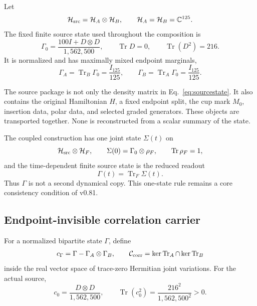\documentclass[12pt,a4paper,twoside]{article}
\begin{document}
Let
\begin{equation}
\mathcal H_{\rm src}=\mathcal H_A\otimes\mathcal H_B,
\qquad \mathcal H_A=\mathcal H_B=\mathbb C^{125}.
\label{eq:sourcehilbert}
\end{equation}
The fixed finite source state used throughout the composition is
\begin{equation}
\Gamma_0=\frac{100I+D\otimes D}{1{,}562{,}500},
\qquad \operatorname{Tr}D=0,
\qquad \operatorname{Tr}(D^2)=216.
\label{eq:sourcestate}
\end{equation}
It is normalized and has maximally mixed endpoint marginals,
\begin{equation}
\Gamma_A=\operatorname{Tr}_B\Gamma_0=\frac{I_{125}}{125},
\qquad
\Gamma_B=\operatorname{Tr}_A\Gamma_0=\frac{I_{125}}{125}.
\label{eq:marginals}
\end{equation}

The source package is not only the density matrix in Eq.~\eqref{eq:sourcestate}. It also contains the original Hamiltonian $H$, a fixed endpoint split, the cup mark $M_0$, insertion data, polar data, and selected graded generators. These objects are transported together. None is reconstructed from a scalar summary of the state.

The coupled construction has one joint state $\Sigma(t)$ on
\begin{equation}
\mathcal H_{\rm src}\otimes\mathcal H_F,
\qquad \Sigma(0)=\Gamma_0\otimes\rho_F,
\qquad \operatorname{Tr}\rho_F=1,
\end{equation}
and the time-dependent finite source state is the reduced readout
\begin{equation}
\Gamma(t)=\operatorname{Tr}_F\Sigma(t).
\label{eq:reducedreadout}
\end{equation}
Thus $\Gamma$ is not a second dynamical copy. This one-state rule remains a core consistency condition of v0.81.

\subsection{Endpoint-invisible correlation carrier}

For a normalized bipartite state $\Gamma$, define
\begin{equation}
c_\Gamma=\Gamma-\Gamma_A\otimes\Gamma_B,
\qquad
\mathcal C_{\rm corr}=\ker\operatorname{Tr}_A\cap\ker\operatorname{Tr}_B
\label{eq:corrkernel}
\end{equation}
inside the real vector space of trace-zero Hermitian joint variations. For the actual source,
\begin{equation}
c_0=\frac{D\otimes D}{1{,}562{,}500},
\qquad
\operatorname{Tr}(c_0^2)=\frac{216^2}{1{,}562{,}500^2}>0.
\end{equation}
\end{document}
